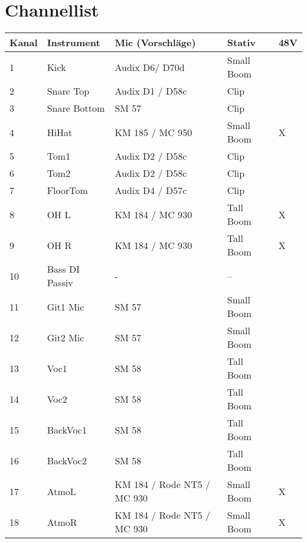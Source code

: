 \section*{Channellist}

\begin{tabular}{|l|l|l|l|l|}
\hline
\textbf{Kanal} & \textbf{Instrument} & \textbf{Mic (Vorschläge)} & \textbf{Stativ} & \textbf{48V}\\
\hline
1  & Kick           & Audix D6/ D70d             & Small Boom &   \\
2  & Snare Top      & Audix D1 / D58c            & Clip       &   \\
3  & Snare Bottom   & SM 57                      & Clip       &   \\
4  & HiHat          & KM 185 / MC 950            & Small Boom & X \\
5  & Tom1           & Audix D2 / D58c            & Clip       &   \\
6  & Tom2           & Audix D2 / D58c            & Clip       &   \\
7  & FloorTom       & Audix D4 / D57c            & Clip       &   \\
8  & OH L           & KM 184 / MC 930            & Tall Boom  & X \\
9  & OH R           & KM 184 / MC 930            & Tall Boom  & X \\
10 & Bass DI Passiv & -                          & --         &   \\
11 & Git1 Mic       & SM 57                      & Small Boom &   \\
12 & Git2 Mic       & SM 57                      & Small Boom &   \\
13 & Voc1           & SM 58                      & Tall Boom  &   \\
14 & Voc2           & SM 58                      & Tall Boom  &   \\
15 & BackVoc1       & SM 58                      & Tall Boom  &   \\
16 & BackVoc2       & SM 58                      & Tall Boom  &   \\
17 & AtmoL          & KM 184 / Rode NT5 / MC 930 & Small Boom & X \\
18 & AtmoR          & KM 184 / Rode NT5 / MC 930 & Small Boom & X \\
\hline
\end{tabular}
